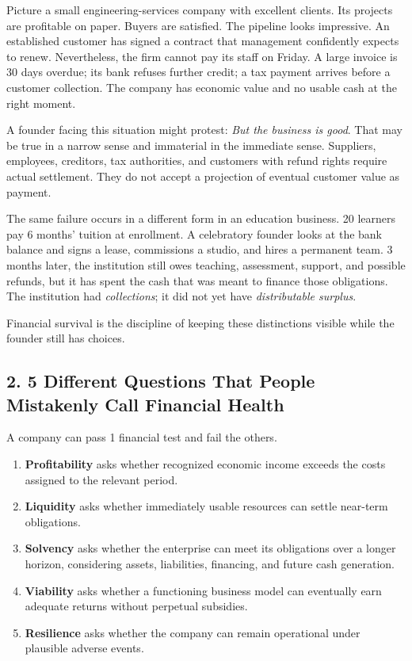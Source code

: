 Picture a small engineering-services company with excellent clients. Its projects are profitable on paper. Buyers are satisfied. The pipeline looks impressive. An established customer has signed a contract that management confidently expects to renew. Nevertheless, the firm cannot pay its staff on Friday. A large invoice is 30 days overdue; its bank refuses further credit; a tax payment arrives before a customer collection. The company has economic value and no usable cash at the right moment.

A founder facing this situation might protest: \emph{But the business is good}. That may be true in a narrow sense and immaterial in the immediate sense. Suppliers, employees, creditors, tax authorities, and customers with refund rights require actual settlement. They do not accept a projection of eventual customer value as payment.

The same failure occurs in a different form in an education business. 20 learners pay 6 months' tuition at enrollment. A celebratory founder looks at the bank balance and signs a lease, commissions a studio, and hires a permanent team. 3 months later, the institution still owes teaching, assessment, support, and possible refunds, but it has spent the cash that was meant to finance those obligations. The institution had \emph{collections}; it did not yet have \emph{distributable surplus}.

Financial survival is the discipline of keeping these distinctions visible while the founder still has choices.

\subsection*{2. 5 Different Questions That People Mistakenly Call Financial Health}

A company can pass 1 financial test and fail the others.
\begin{enumerate}
\item \textbf{Profitability} asks whether recognized economic income exceeds the costs assigned to the relevant period.
\item \textbf{Liquidity} asks whether immediately usable resources can settle near-term obligations.
\item \textbf{Solvency} asks whether the enterprise can meet its obligations over a longer horizon, considering assets, liabilities, financing, and future cash generation.
\item \textbf{Viability} asks whether a functioning business model can eventually earn adequate returns without perpetual subsidies.
\item \textbf{Resilience} asks whether the company can remain operational under plausible adverse events.
\end{enumerate}

